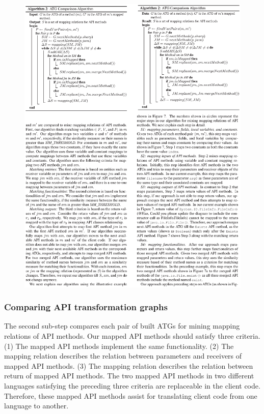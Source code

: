 \begin{figure}[t]
\centering
\includegraphics[scale=1,clip]{figure/algorithm2.eps}
\vspace*{-6ex}
\end{figure}

\subsubsection{Comparing API transformation graphs}

The second sub-step compares each pair of built ATGs for mining
mapping relations of API methods. Our mapped API methods should satisfy
three criteria. (1) The mapped API methods implement the same
functionality. (2) The mapping relation describes the relation between
parameters and receivers of mapped API methods. (3) The mapping relation
describes the relation between return of mapped API methods.
The two mapped API methods in two different languages satisfying the
preceding three criteria are replaceable in the client code.
Therefore, these mapped API methods assist for translating client
code from one language to another.

